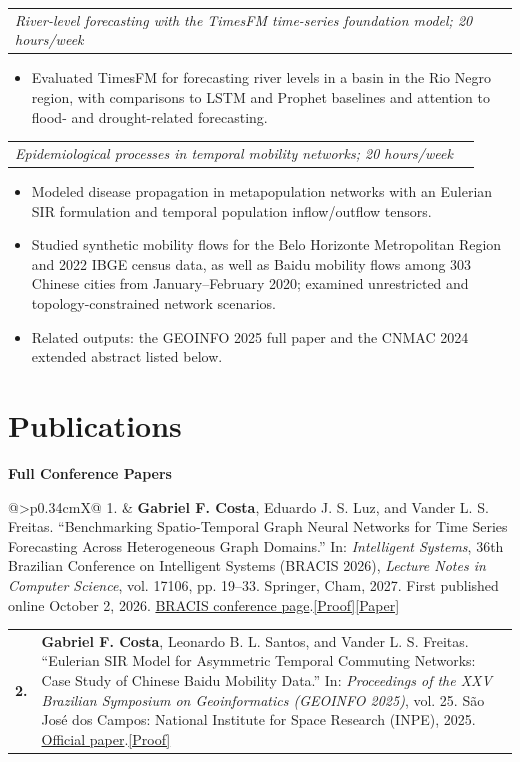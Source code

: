 \documentclass[10pt]{article}
\makeatletter
\newcommand{\doclink}[2]{\nobreak\hspace{0.22em}\href{#1}{{\footnotesize\color{accent}[#2]}}}
\newcommand{\ICOneURL}{https://drive.google.com/file/d/1M2AT0UKJaOF6yS4SjeIPE9IpT0UnqUCm/view}
\newcommand{\ICTwoURL}{https://drive.google.com/file/d/1svA79nIMFWv5lpNJQ_-OrvjGmKTD9qcu/view}
\newcommand{\BRACISProofURL}{https://link.springer.com/chapter/10.1007/978-3-032-39892-5_2}
\newcommand{\BRACISPaperURL}{https://drive.google.com/file/d/1xEHXmrJzOGzdaggtMbeAdGOa_5EqG1e8/view}
\newcommand{\GEOINFOProofURL}{https://drive.google.com/file/d/1x12glvq9NxPw7d946ycUNCOKZgmrGaUb/view}
\newcommand{\entry}[3]{%
  \needspace{2.5\baselineskip}%
  \begin{tabularx}{\linewidth}{@{}X>{\raggedleft\arraybackslash}p{2.35cm}@{}}
    \textbf{#1} & {\color{muted}\small #2}\\[-0.08em]
    \multicolumn{2}{@{}p{\linewidth}@{}}{{\itshape #3}}
  \end{tabularx}\par
}
\newcommand{\pub}[2]{%
  \needspace{3\baselineskip}%
  \noindent\begin{tabularx}{\linewidth}{@{}>{\bfseries\color{accent}}p{0.34cm}X@{}}
    #1 & #2
  \end{tabularx}\par
}
\makeatother
\begin{document}
\entry{Undergraduate Research Fellow --- CNPq / UFOP\doclink{\ICTwoURL}{Proof}}{2024--2025}{River-level forecasting with the TimesFM time-series foundation model; 20 hours/week}
\begin{itemize}
  \item Evaluated TimesFM for forecasting river levels in a basin in the Rio Negro region, with comparisons to LSTM and Prophet baselines and attention to flood- and drought-related forecasting.
\end{itemize}

\entry{Undergraduate Research Fellow --- CNPq / UFOP\doclink{\ICOneURL}{Proof}}{2022--2024}{Epidemiological processes in temporal mobility networks; 20 hours/week}
\begin{itemize}
  \item Modeled disease propagation in metapopulation networks with an Eulerian SIR formulation and temporal population inflow/outflow tensors.
  \item Studied synthetic mobility flows for the Belo Horizonte Metropolitan Region and 2022 IBGE census data, as well as Baidu mobility flows among 303 Chinese cities from January--February 2020; examined unrestricted and topology-constrained network scenarios.
  \item Related outputs: the GEOINFO 2025 full paper and the CNMAC 2024 extended abstract listed below.
\end{itemize}

\section{Publications}

\textbf{Full Conference Papers}

\pub{1.}{\textbf{Gabriel F. Costa}, Eduardo J. S. Luz, and Vander L. S. Freitas. ``Benchmarking Spatio-Temporal Graph Neural Networks for Time Series Forecasting Across Heterogeneous Graph Domains.'' In: \emph{Intelligent Systems}, 36th Brazilian Conference on Intelligent Systems (BRACIS 2026), \emph{Lecture Notes in Computer Science}, vol. 17106, pp. 19--33. Springer, Cham, 2027. First published online October 2, 2026. \href{https://bracis.sbc.org.br/2026/bracis/}{BRACIS conference page}.\doclink{\BRACISProofURL}{Proof}\doclink{\BRACISPaperURL}{Paper}}

\pub{2.}{\textbf{Gabriel F. Costa}, Leonardo B. L. Santos, and Vander L. S. Freitas. ``Eulerian SIR Model for Asymmetric Temporal Commuting Networks: Case Study of Chinese Baidu Mobility Data.'' In: \emph{Proceedings of the XXV Brazilian Symposium on Geoinformatics (GEOINFO 2025)}, vol. 25. São José dos Campos: National Institute for Space Research (INPE), 2025. \href{https://mtc-m16c.sid.inpe.br/col/sid.inpe.br/mtc-m16c/2025/06.05.14.34/doc/GeoInfo2025_Paper59.pdf}{Official paper}.\doclink{\GEOINFOProofURL}{Proof}}
\end{document}
